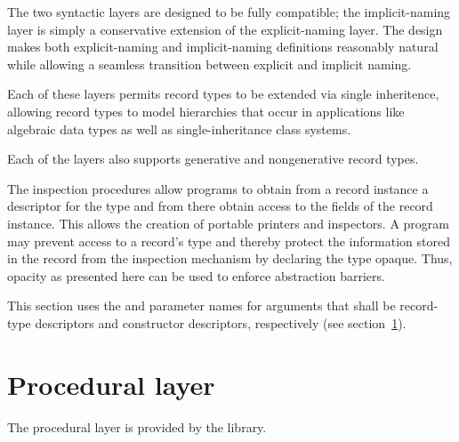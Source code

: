 The two syntactic layers are designed to be fully compatible; the
implicit-naming layer is simply a conservative extension of the
explicit-naming layer.  The design makes both explicit-naming and
implicit-naming definitions reasonably natural while allowing a seamless
transition between explicit and implicit naming.

Each of these layers permits record types to be extended via single
inheritence, allowing record types to model hierarchies that occur in
applications like algebraic data types as well as single-inheritance class
systems.

Each of the layers also supports generative and nongenerative record types.

The inspection procedures allow programs to obtain from a record instance a
descriptor for the type and from there obtain access to the fields of the
record instance. This allows the creation of portable printers and inspectors.
A program may prevent access to a record's type and thereby protect the
information stored in the record from the inspection mechanism by declaring the
type opaque. Thus, opacity as presented here can be used to enforce abstraction
barriers.

This section uses the  and 
parameter names for arguments that shall be record-type descriptors
and constructor descriptors, respectively (see
section~\ref{recordsproceduralsection}).

\section{Procedural layer}
\label{recordsproceduralsection}

The procedural layer is provided by the  library.

